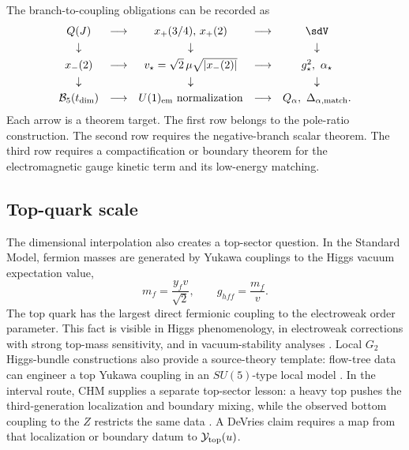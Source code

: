The branch-to-coupling obligations can be recorded as
\begin{equation}
\begin{array}{ccccc}
Q(J) &\longrightarrow& x_+(3/4),\,x_+(2)
&\longrightarrow& \sdV
\\[3pt]
\downarrow && \downarrow && \downarrow
\\[3pt]
x_-(2) &\longrightarrow&
v_\star=\sqrt2\,\mu\sqrt{|x_-(2)|}
&\longrightarrow&
g_\star^2,\ \alpha_\star
\\[3pt]
\downarrow && \downarrow && \downarrow
\\[3pt]
\mathcal B_5(t_{\rm dim}) &\longrightarrow&
U(1)_{\rm em}\ {\rm normalization}
&\longrightarrow&
Q_\alpha,\ \Delta_{\alpha,{\rm match}} .
\end{array}
\label{eq:branch-to-coupling-obligations}
\end{equation}
Each arrow is a theorem target.  The first row belongs to the pole-ratio
construction.  The second row requires the negative-branch scalar theorem.
The third row requires a compactification or boundary theorem for the
electromagnetic gauge kinetic term and its low-energy matching.

\subsection{Top-quark scale}
\label{app:top-quark-scale}

The dimensional interpolation also creates a top-sector question.  In the
Standard Model, fermion masses are generated by Yukawa couplings to the Higgs
vacuum expectation value,
\begin{equation}
  m_f=\frac{y_f v}{\sqrt2},
  \qquad
  g_{hff}=\frac{m_f}{v}.
  \label{eq:top-yukawa-sm-fact}
\end{equation}
The top quark has the largest direct fermionic coupling to the electroweak
order parameter.  This fact is visible in Higgs phenomenology, in electroweak
corrections with strong top-mass sensitivity, and in vacuum-stability analyses
\cite{Logan2022,Dawson2018,AlvarezGaumeVazquezMozo2023}.
Local \(G_2\) Higgs-bundle constructions also provide a source-theory template:
flow-tree data can engineer a top Yukawa coupling in an \(SU(5)\)-type local
model \cite{BraunEtAl2019}.
In the interval route, CHM supplies a separate top-sector lesson: a heavy top
pushes the third-generation localization and boundary mixing, while the
observed bottom coupling to the \(Z\) restricts the same data
\cite{CsakiHubiszMeade2005}.  A DeVries claim requires a map from that
localization or boundary datum to \(\mathcal Y_{\rm top}(u)\).

